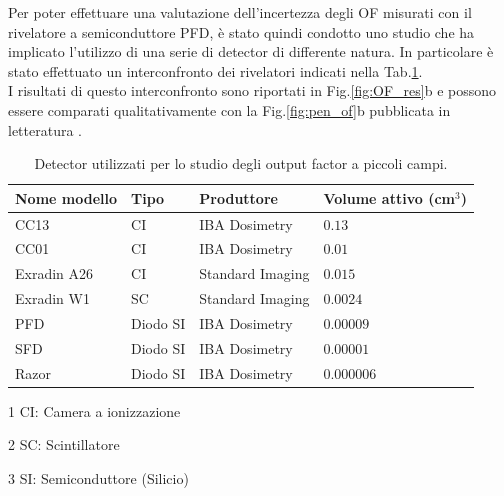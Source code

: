 Per poter effettuare una valutazione dell'incertezza degli OF misurati con il rivelatore a semiconduttore PFD, è stato quindi condotto uno studio che ha implicato l'utilizzo di una serie di detector di differente natura. In particolare è stato effettuato un interconfronto dei rivelatori indicati nella Tab.\ref{tab:OF_inter}.\\ I risultati di questo interconfronto sono riportati in Fig.\ref{fig:OF_res}b e possono essere comparati qualitativamente con la Fig.\ref{fig:pen_of}b pubblicata in letteratura \cite{Das2008}.
\begin{table}[!t]
\centering
{}
\begin{threeparttable}
\begin{tabular}{llll}
\toprule
Nome modello & Tipo & Produttore & Volume attivo (cm$^3$)\\
\midrule
CC13 & CI\tnote{1} & IBA Dosimetry & $0.13$\\
CC01 & CI & IBA Dosimetry & $0.01$\\
Exradin A26 & CI & Standard Imaging & $0.015$ \\
Exradin W1 & SC\tnote{2} & Standard Imaging & $0.0024$ \\
PFD & Diodo SI\tnote{3} & IBA Dosimetry & $0.00009$ \\
SFD & Diodo SI & IBA Dosimetry & $0.00001$ \\
Razor & Diodo SI & IBA Dosimetry & $0.000006$ \\
\bottomrule
\end{tabular}
\begin{tablenotes}[para]
\item[1] CI: Camera a ionizzazione
\item[2] SC: Scintillatore
\item[3] SI: Semiconduttore (Silicio)
\end{tablenotes}
\end{threeparttable}
\caption{Detector utilizzati per lo studio degli output factor a piccoli campi.}
\label{tab:OF_inter}
\end{table}
